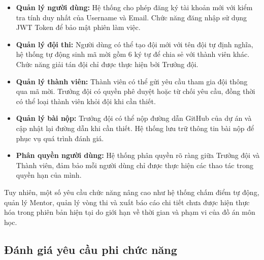 \documentclass[12pt,a4paper]{report}
\begin{document}
\begin{itemize}
	\item \textbf{Quản lý người dùng:} Hệ thống cho phép đăng ký tài khoản mới với kiểm tra tính duy nhất của Username và Email. Chức năng đăng nhập sử dụng JWT Token để bảo mật phiên làm việc.
	
	\item \textbf{Quản lý đội thi:} Người dùng có thể tạo đội mới với tên đội tự định nghĩa, hệ thống tự động sinh mã mời gồm 6 ký tự để chia sẻ với thành viên khác. Chức năng giải tán đội chỉ được thực hiện bởi Trưởng đội.
	
	\item \textbf{Quản lý thành viên:} Thành viên có thể gửi yêu cầu tham gia đội thông qua mã mời. Trưởng đội có quyền phê duyệt hoặc từ chối yêu cầu, đồng thời có thể loại thành viên khỏi đội khi cần thiết.
	
	\item \textbf{Quản lý bài nộp:} Trưởng đội có thể nộp đường dẫn GitHub của dự án và cập nhật lại đường dẫn khi cần thiết. Hệ thống lưu trữ thông tin bài nộp để phục vụ quá trình đánh giá.
	
	\item \textbf{Phân quyền người dùng:} Hệ thống phân quyền rõ ràng giữa Trưởng đội và Thành viên, đảm bảo mỗi người dùng chỉ được thực hiện các thao tác trong quyền hạn của mình.
\end{itemize}

Tuy nhiên, một số yêu cầu chức năng nâng cao như hệ thống chấm điểm tự động, quản lý Mentor, quản lý vòng thi và xuất báo cáo chi tiết chưa được hiện thực hóa trong phiên bản hiện tại do giới hạn về thời gian và phạm vi của đồ án môn học.


\subsection{Đánh giá yêu cầu phi chức năng}
\end{document}
